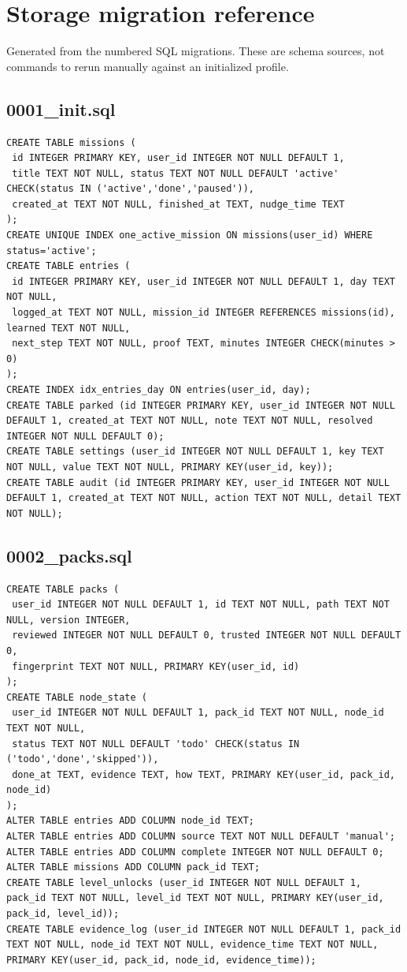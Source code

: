 \section{Storage migration reference}
Generated from the numbered SQL migrations. These are schema sources, not commands to rerun manually against an initialized profile.
\subsection{0001\_init.sql}
\begin{verbatim}
CREATE TABLE missions (
 id INTEGER PRIMARY KEY, user_id INTEGER NOT NULL DEFAULT 1,
 title TEXT NOT NULL, status TEXT NOT NULL DEFAULT 'active' CHECK(status IN ('active','done','paused')),
 created_at TEXT NOT NULL, finished_at TEXT, nudge_time TEXT
);
CREATE UNIQUE INDEX one_active_mission ON missions(user_id) WHERE status='active';
CREATE TABLE entries (
 id INTEGER PRIMARY KEY, user_id INTEGER NOT NULL DEFAULT 1, day TEXT NOT NULL,
 logged_at TEXT NOT NULL, mission_id INTEGER REFERENCES missions(id), learned TEXT NOT NULL,
 next_step TEXT NOT NULL, proof TEXT, minutes INTEGER CHECK(minutes > 0)
);
CREATE INDEX idx_entries_day ON entries(user_id, day);
CREATE TABLE parked (id INTEGER PRIMARY KEY, user_id INTEGER NOT NULL DEFAULT 1, created_at TEXT NOT NULL, note TEXT NOT NULL, resolved INTEGER NOT NULL DEFAULT 0);
CREATE TABLE settings (user_id INTEGER NOT NULL DEFAULT 1, key TEXT NOT NULL, value TEXT NOT NULL, PRIMARY KEY(user_id, key));
CREATE TABLE audit (id INTEGER PRIMARY KEY, user_id INTEGER NOT NULL DEFAULT 1, created_at TEXT NOT NULL, action TEXT NOT NULL, detail TEXT NOT NULL);
\end{verbatim}
\subsection{0002\_packs.sql}
\begin{verbatim}
CREATE TABLE packs (
 user_id INTEGER NOT NULL DEFAULT 1, id TEXT NOT NULL, path TEXT NOT NULL, version INTEGER,
 reviewed INTEGER NOT NULL DEFAULT 0, trusted INTEGER NOT NULL DEFAULT 0,
 fingerprint TEXT NOT NULL, PRIMARY KEY(user_id, id)
);
CREATE TABLE node_state (
 user_id INTEGER NOT NULL DEFAULT 1, pack_id TEXT NOT NULL, node_id TEXT NOT NULL,
 status TEXT NOT NULL DEFAULT 'todo' CHECK(status IN ('todo','done','skipped')),
 done_at TEXT, evidence TEXT, how TEXT, PRIMARY KEY(user_id, pack_id, node_id)
);
ALTER TABLE entries ADD COLUMN node_id TEXT;
ALTER TABLE entries ADD COLUMN source TEXT NOT NULL DEFAULT 'manual';
ALTER TABLE entries ADD COLUMN complete INTEGER NOT NULL DEFAULT 0;
ALTER TABLE missions ADD COLUMN pack_id TEXT;
CREATE TABLE level_unlocks (user_id INTEGER NOT NULL DEFAULT 1, pack_id TEXT NOT NULL, level_id TEXT NOT NULL, PRIMARY KEY(user_id, pack_id, level_id));
CREATE TABLE evidence_log (user_id INTEGER NOT NULL DEFAULT 1, pack_id TEXT NOT NULL, node_id TEXT NOT NULL, evidence_time TEXT NOT NULL, PRIMARY KEY(user_id, pack_id, node_id, evidence_time));
\end{verbatim}
